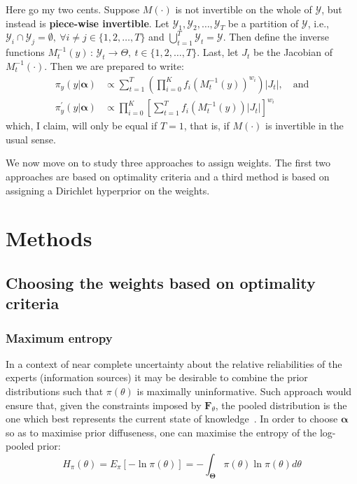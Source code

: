 \documentclass[a4paper, notitlepage, 10pt]{article}
\begin{document}
Here go my two cents.
Suppose $M(\cdot)$ is not invertible on the whole of $\mathcal{Y}$, but instead is \textbf{piece-wise invertible}.
Let $\mathcal{Y}_1, \mathcal{Y}_2, \ldots, \mathcal{Y}_T$ be a  partition of $\mathcal{Y}$, i.e., $\mathcal{Y}_i\cap\mathcal{Y}_j = \emptyset,\: \forall i\neq j \in \{1, 2, \ldots, T\}$ and $\bigcup_{t = 1}^T\mathcal{Y}_t = \mathcal{Y}$.
Then define the inverse functions $M_{t}^{-1}(y)\,:\, \mathcal{Y}_t \to \Theta, \: t \in \{1, 2, \ldots, T\}$.
Last, let $J_t$ be the Jacobian of $M_{t}^{-1}(\cdot)$.
Then we are prepared to write:
\begin{align}
\label{eq:piecewiseTransf}
\pi_{y}(y |\boldsymbol\alpha) &\propto \sum_{t = 1}^T\left(\prod_{i=0}^K f_i(M_t^{-1}(y))^{w_i}\right)|J_t|, \quad \text{and}\\
\pi^{\prime}_{y}(y|\boldsymbol\alpha) &\propto \prod_{i=0}^K\left[\sum_{t = 1}^T f_i(M_t^{-1}(y))|J_t|\right]^{w_i}
\end{align}
which, I claim, will only be equal if $T = 1$, that is,  if $M(\cdot)$ is invertible in the usual sense.


We now move on to study three approaches to assign weights.
The first two approaches are based on optimality criteria and a third method is based on assigning a Dirichlet hyperprior on the weights.
\section*{Methods}
\subsection*{Choosing the weights based on optimality criteria}
\subsubsection*{Maximum entropy}

In a context of near complete uncertainty about the relative reliabilities of the experts (information sources) it may be desirable to combine the prior distributions such that $\pi(\theta)$ is maximally uninformative. %
Such approach would ensure that, given the constraints imposed by $\mathbf{F}_{\theta}$, the pooled distribution is the one which best represents the current state of knowledge~\citep{jaynes1957,savchuk1994}.
In order to choose $\boldsymbol\alpha$ so as to maximise prior 
diffuseness, one can maximise the entropy of the log-pooled prior:
\begin{equation}
\label{eq:entropypiA}
H_{\pi}(\theta) = E_{\pi}\left[-\ln\pi(\theta) \right] =-\int_{\boldsymbol\Theta}\pi(\theta)\ln\pi(\theta)d\theta 
\end{equation}
\end{document}
